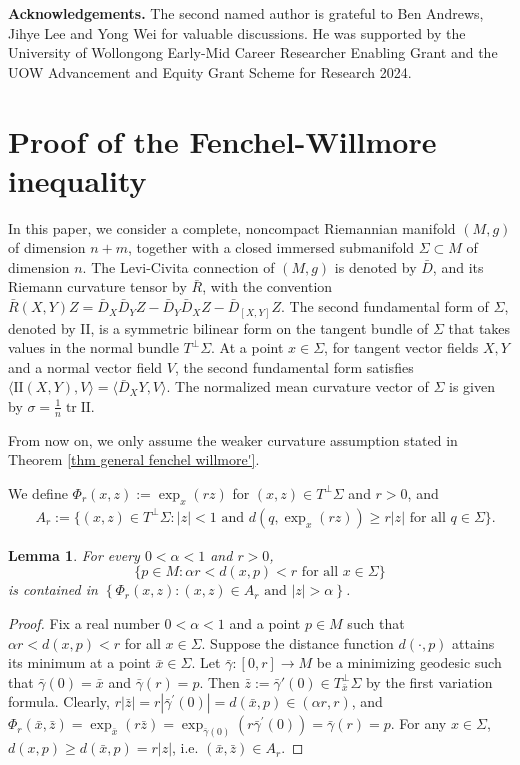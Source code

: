 \documentclass[11pt, reqno]{amsart}
\newtheorem{lemma}[theorem]{Lemma}
\numberwithin{equation}{section}
\begin{document}
\noindent\textbf{Acknowledgements.}
The second named author is grateful to Ben Andrews, Jihye Lee and Yong Wei for valuable discussions. He was supported by the University of Wollongong Early-Mid Career Researcher Enabling Grant and the UOW Advancement and Equity Grant Scheme for Research 2024.

\section{Proof of the Fenchel-Willmore inequality}\label{sec willmore fenchel}
In this paper, we consider a complete, noncompact Riemannian manifold $(M, g)$ of dimension $n + m$, together with a closed immersed submanifold $\Sigma \subset M$ of dimension $n$. The Levi-Civita connection of $(M, g)$ is denoted by $\bar{D}$, and its Riemann curvature tensor by $\bar{R}$, with the convention $\bar{R}(X, Y)Z = \bar{D}_X \bar{D}_Y Z - \bar{D}_Y \bar{D}_X Z - \bar{D}_{[X, Y]} Z$. The second fundamental form of $\Sigma$, denoted by $\mathrm{II}$, is a symmetric bilinear form on the tangent bundle of $\Sigma$ that takes values in the normal bundle $T^\perp \Sigma$. At a point $x \in \Sigma$, for tangent vector fields $X, Y$ and a normal vector field $V$, the second fundamental form satisfies $\langle \mathrm{II}(X, Y), V \rangle = \langle \bar{D}_X Y, V \rangle$. The normalized mean curvature vector of $\Sigma$ is given by $\sigma = \frac{1}{n} \operatorname{tr} \mathrm{II}$.

From now on, we only assume the weaker curvature assumption stated in Theorem \ref{thm general fenchel willmore'}.

We define $\Phi_r(x, z):=\exp_{x}\left(r z\right)$ for $(x, z)\in T^\perp \Sigma$ and $r>0$, and
\begin{equation*}
\begin{aligned}
& A_r:= \{ (x, z) \in T^\perp \Sigma: |z|< 1 \text{ and } d\left(q, \exp_x\left(r z\right)\right) \ge r |z| \text{ for all } q \in \Sigma \}.
\end{aligned}
\end{equation*}
\begin{lemma}\label{lem 2.2''}
For every $0 <\alpha<1$ and $r>0$,
$$
\{p \in M: \alpha r<d(x, p)<r \text { for all } x \in \Sigma\}
$$
is contained in $\left\{\Phi_r(x, z):(x, z) \in A_r \text { and }|z|>\alpha\right\}$.
\end{lemma}
\begin{proof}
Fix a real number $0 <\alpha<1$ and a point $p \in M$ such that $\alpha r<d(x, p)<r$ for all $x \in \Sigma$.
Suppose the distance function $d(\cdot, p)$ attains its minimum at a point $\bar{x} \in \Sigma$.
Let $\bar{\gamma}:[0, r] \rightarrow M$ be a minimizing geodesic such that $\bar{\gamma}(0)=\bar{x}$ and $\bar{\gamma}(r)=p$.
Then $\bar z:=\bar\gamma'(0)\in T_{\bar x}^\perp \Sigma$ by the first variation formula. Clearly, $r|\bar z|=r\left|\bar{\gamma}^{\prime}(0)\right|=d(\bar{x}, p)\in(\alpha r, r)$, and
$\Phi_r(\bar{x}, \bar{z})=\exp_{\bar{x}}\left(r \bar{z}\right)=\exp_{\bar{\gamma}(0)}\left(r \bar{\gamma}^{\prime}(0)\right)=\bar{\gamma}(r)=p$.
For any $x\in \Sigma$, $d(x, p)\ge d(\bar x, p)= r|z|$, i.e. $(\bar x, \bar z)\in A_r$.
\end{proof}
\end{document}
